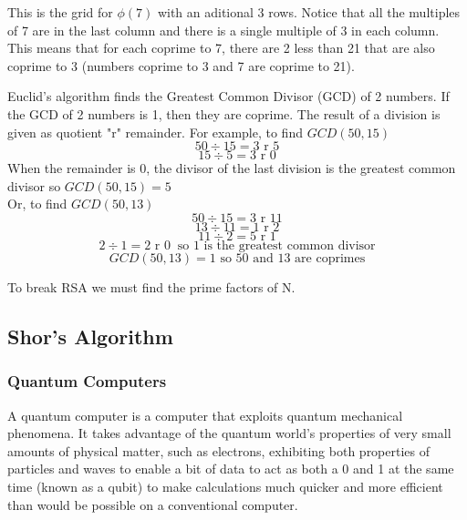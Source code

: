 \documentclass{article}
\begin{document}
This is the grid for \(\phi(7)\) with an aditional 3 rows. Notice that all the
multiples of 7 are in the last column and there is a single multiple of 3 in
each column. This means that for each coprime to 7, there are 2 less than 21
that are also coprime to 3 (numbers coprime to 3 and 7 are coprime to 21).

Euclid's algorithm finds the Greatest Common Divisor (GCD) of 2 numbers. If the
GCD of 2 numbers is 1, then they are coprime.  The result of a division is
given as quotient "r" remainder.
For example, to find \(GCD(50,15)\)
\[
50 \div 15 = 3 \text{ r } 5\]
\[
   15 \div 5 = 3 \text{  r  } 0
\]
When the remainder is 0, the divisor of the last division is the greatest
common divisor so \(GCD(50,15) = 5\)\\

Or, to find \(GCD(50,13)\)
\[50 \div 15 = 3 \text{  r  } 11\]
\[13 \div 11 = 1\text{  r  }2\]
\[11 \div 2 = 5\text{  r  }1\]
\[2 \div 1 = 2\text{  r  }0\ \text{ so 1 is the greatest common divisor}\]
\[GCD(50,13) = 1 \text{  so  } 50 \text{ and } 13 \text{ are coprimes}\]

To break RSA we must find the prime factors of N.


\subsection{Shor's Algorithm}
\subsubsection{Quantum Computers}
   A quantum computer is a computer that exploits quantum mechanical phenomena.
   It takes advantage of the quantum world’s properties of very small amounts
   of physical matter, such as electrons, exhibiting both properties of
   particles and waves to enable a bit of data to act as both a 0 and 1 at the
   same time (known as a qubit) to make calculations much quicker and more
   efficient than would be possible on a conventional computer. 
   \medskip
\end{document}

